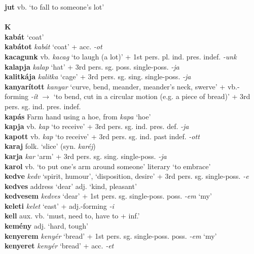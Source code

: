\documentclass[11pt]{article}
\begin{document}
\textbf{jut} vb. `to fall to someone's lot' \\
\ \\
\noindent \textbf{\large K} \\
\textbf{kabát} `coat' \\
\textbf{kabátot} \emph{kabát} `coat' + acc. \emph{-ot} \\
\textbf{kacagunk} vb. \emph{kacag} `to laugh (a lot)' + 1st
pers. pl. ind. pres. indef. \emph{-unk} \\
\textbf{kalapja} \emph{kalap} `hat' + 3rd
pers. sg. poss. single\hyp{}poss. \emph{-ja} \\
\textbf{kalitkája} \emph{kalitka} `cage' + 3rd
pers. sg. sing. single\hyp{}poss. \emph{-ja} \\
\textbf{kanyarított} \emph{kanyar} `curve, bend, meander, meander's
neck, swerve' + vb.\hyp{}forming \emph{-ít}
$\rightarrow$ `to bend, cut in a circular motion (e.g. a piece of
bread)' + 3rd pers. sg. ind. pres. indef. \\
\textbf{kapás} Farm hand using a hoe, from \emph{kapa} `hoe' \\
\textbf{kapja} vb. \emph{kap} `to receive' + 3rd
pers. sg. ind. pres. def. \emph{-ja} \\
\textbf{kapott} vb. \emph{kap} `to receive' + 3rd
pers. sg. ind. past indef. \emph{-ott} \\
\textbf{karaj} folk. `slice' (syn. \emph{karéj}) \\
\textbf{karja} \emph{kar} `arm' + 3rd
pers. sg. sing. single\hyp{}poss. \emph{-ja} \\
\textbf{karol} vb. `to put one's arm around
someone' \textbar\textbar{} literary `to embrace' \\
\textbf{kedve} \emph{kedv} `spirit, humour', `disposition, desire' +
3rd pers. sg. single\hyp{}poss. \emph{-e} \\
\textbf{kedves} address `dear' \textbar\textbar{} adj. `kind, pleasant' \\
\textbf{kedvesem} \emph{kedves} `dear' + 1st
pers. sg. single\hyp{}poss. poss. \emph{-em} `my' \\
\textbf{keleti} \emph{kelet} `east' + adj.\hyp{}forming \emph{-i} \\
\textbf{kell} aux. vb. `must, need to, have to + inf.' \\
\textbf{kemény} adj. `hard, tough' \\
\textbf{kenyerem} \emph{kenyér} `bread' + 1st
pers. sg. single\hyp{}poss. poss. \emph{-em} `my' \\
\textbf{kenyeret} \emph{kenyér} `bread' + acc. \emph{-et}
\end{document}
